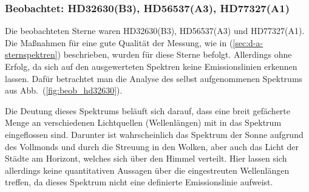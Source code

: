 \subsubsection{Beobachtet: HD32630(B3), HD56537(A3), HD77327(A1)} \label{sec:beobachtet}
Die beobachteten Sterne waren HD32630(B3), HD56537(A3) und HD77327(A1).
Die Maßnahmen für eine gute Qualität der Messung, wie in (\ref{sec:d-a-sternspektren}) beschrieben, wurden für diese Sterne befolgt.
Allerdings ohne Erfolg, da sich auf den ausgewerteten Spektren keine Emissionslinien erkennen lassen.
Dafür betrachtet man die Analyse des selbst aufgenommenen Spektrums aus Abb.\ (\ref{fig:beob_hd32630}).

Die Deutung dieses Spektrums beläuft sich darauf, dass eine breit gefächerte Menge an verschiedenen Lichtquellen (Wellenlängen) mit in das Spektrum eingeflossen sind.
Darunter ist wahrscheinlich das Spektrum der Sonne aufgrund des Vollmonds und durch die Streuung in den Wolken, aber auch das Licht der Städte am Horizont, welches sich über den Himmel verteilt. 
Hier lassen sich allerdings keine quantitativen Aussagen über die eingestreuten Wellenlängen treffen, da dieses Spektrum nicht eine definierte Emissionslinie aufweist.
